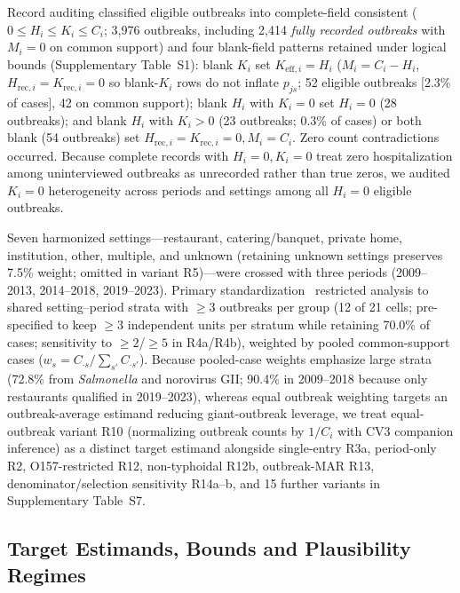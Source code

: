 Record auditing classified eligible outbreaks into complete-field consistent ($0 \le H_i \le K_i \le C_i$; 3,976 outbreaks, including 2,414 \textit{fully recorded outbreaks} with $M_i = 0$ on common support) and four blank-field patterns retained under logical bounds (Supplementary Table~S1): blank $K_i$ set $K_{\text{eff},i} = H_i$ ($M_i = C_i - H_i$, $H_{\text{rec},i} = K_{\text{rec},i} = 0$ so blank-$K_i$ rows do not inflate $p_{js}$; 52 eligible outbreaks [2.3\% of cases], 42 on common support); blank $H_i$ with $K_i = 0$ set $H_i = 0$ (28 outbreaks); and blank $H_i$ with $K_i > 0$ (23 outbreaks; 0.3\% of cases) or both blank (54 outbreaks) set $H_{\text{rec},i} = K_{\text{rec},i} = 0, M_i = C_i$. Zero count contradictions occurred. Because complete records with $H_i = 0, K_i = 0$ treat zero hospitalization among uninterviewed outbreaks as unrecorded rather than true zeros, we audited $K_i = 0$ heterogeneity across periods and settings among all $H_i = 0$ eligible outbreaks.

Seven harmonized settings---restaurant, catering/banquet, private home, institution, other, multiple, and unknown (retaining unknown settings preserves 7.5\% weight; omitted in variant R5)---were crossed with three periods (2009--2013, 2014--2018, 2019--2023). Primary standardization~\cite{keiding2014standardization} restricted analysis to shared setting--period strata with $\ge 3$ outbreaks per group (12 of 21 cells; pre-specified to keep $\ge 3$ independent units per stratum while retaining 70.0\% of cases; sensitivity to $\ge 2$/$\ge 5$ in R4a/R4b), weighted by pooled common-support cases ($w_s = C_{\cdot s}/\sum_{s'} C_{\cdot s'}$). Because pooled-case weights emphasize large strata (72.8\% from \textit{Salmonella} and norovirus GII; 90.4\% in 2009--2018 because only restaurants qualified in 2019--2023), whereas equal outbreak weighting targets an outbreak-average estimand reducing giant-outbreak leverage, we treat equal-outbreak variant R10 (normalizing outbreak counts by $1/C_i$ with CV3 companion inference) as a distinct target estimand alongside single-entry R3a, period-only R2, O157-restricted R12, non-typhoidal R12b, outbreak-MAR R13, denominator/selection sensitivity R14a--b, and 15 further variants in Supplementary Table~S7.

\subsection{Target Estimands, Bounds and Plausibility Regimes}\label{sec:bounds}

